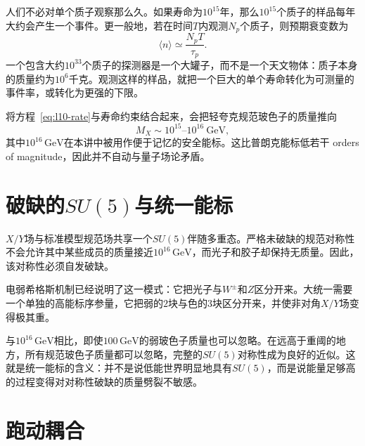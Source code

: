 人们不必对单个质子观察那么久。如果寿命为\(10^{15}\)年，那么\(10^{15}\)个质子的样品每年大约会产生一个事件。更一般地，若在时间\(T\)内观测\(N_p\)个质子，则预期衰变数为
\begin{equation}
\langle n\rangle\simeq\frac{N_pT}{\tau_p}.
\label{eq:l10-event-count}
\end{equation}
一个包含大约\(10^{33}\)个质子的探测器是一个大罐子，而不是一个天文物体：质子本身的质量约为\(10^6\)千克。观测这样的样品，就把一个巨大的单个寿命转化为可测量的事件率，或转化为更强的下限。

将方程~\eqref{eq:l10-rate}与寿命约束结合起来，会把轻夸克规范玻色子的质量推向
\begin{equation}
M_X\sim10^{15}\text{--}10^{16}\ \mathrm{GeV},
\label{eq:l10-mx}
\end{equation}
其中\(10^{16}\,\mathrm{GeV}\)在本讲中被用作便于记忆的安全能标。这比普朗克能标低若干 orders of magnitude，因此并不自动与量子场论矛盾。

\section{破缺的\texorpdfstring{\(SU(5)\)}{SU(5)}与统一能标}

\(X/Y\)场与标准模型规范场共享一个\(SU(5)\)伴随多重态。严格未破缺的规范对称性不会允许其中某些成员的质量接近\(10^{16}\,\mathrm{GeV}\)，而光子和胶子却保持无质量。因此，该对称性必须自发破缺。

\begin{classroomqa}
\end{classroomqa}

电弱希格斯机制已经说明了这一模式：它把光子与\(W^\pm\)和\(Z\)区分开来。大统一需要一个单独的高能标序参量，它把弱的\(2\)块与色的\(3\)块区分开来，并使非对角\(X/Y\)场变得极其重。

与\(10^{16}\,\mathrm{GeV}\)相比，即使\(100\,\mathrm{GeV}\)的弱玻色子质量也可以忽略。在远高于重阈的地方，所有规范玻色子质量都可以忽略，完整的\(SU(5)\)对称性成为良好的近似。这就是统一能标的含义：并不是说低能世界明显地具有\(SU(5)\)，而是说能量足够高的过程变得对对称性破缺的质量劈裂不敏感。

\section{跑动耦合}

